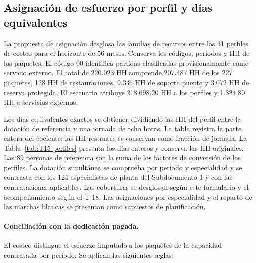 \subsection{Asignación de esfuerzo por perfil y días equivalentes}
\label{sec:T15-asignacion-perfil}

La propuesta de asignación desglosa las familias de recursos entre los 31 perfiles de costeo para el horizonte de 56 meses. Conserva los códigos, períodos y HH de los paquetes. El código 00 identifica partidas clasificadas provisionalmente como servicio externo. El total de 220.023 HH comprende 207.487 HH de los 227 paquetes, 128 HH de restauraciones, 9.336 HH de soporte puente y 3.072 HH de reserva protegida. El escenario atribuye 218.698,20 HH a los perfiles y 1.324,80 HH a servicios externos.

Los días equivalentes exactos se obtienen dividiendo las HH del perfil entre la dotación de referencia y una jornada de ocho horas. La tabla registra la parte entera del cociente; las HH restantes se conservan como fracción de jornada. La Tabla~\ref{tab:T15-perfiles} presenta los días enteros y conserva las HH originales. Las 89 personas de referencia son la suma de los factores de conversión de los perfiles. La dotación simultánea se comprueba por período y especialidad y se contrasta con los 124 especialistas de planta del Subdocumento 1 y con las contrataciones aplicables. Las coberturas se desglosan según este formulario y el acompañamiento según el T-18. Las asignaciones por especialidad y el reparto de las marchas blancas se presentan como supuestos de planificación.

\paragraph{Conciliación con la dedicación pagada.}
El costeo distingue el esfuerzo imputado a los paquetes de la capacidad contratada por período. Se aplican las siguientes reglas:

